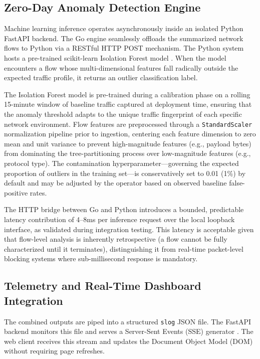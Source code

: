\documentclass[conference]{IEEEtran}
\begin{document}
\subsection{Zero-Day Anomaly Detection Engine}
Machine learning inference operates asynchronously inside an isolated Python FastAPI backend. The Go engine seamlessly offloads the summarized network flows to Python via a RESTful HTTP POST mechanism. The Python system hosts a pre-trained scikit-learn Isolation Forest model \cite{scikit2011}. When the model encounters a flow whose multi-dimensional features fall radically outside the expected traffic profile, it returns an outlier classification label.

The Isolation Forest model is pre-trained during a calibration phase on a rolling 15-minute window of baseline traffic captured at deployment time, ensuring that the anomaly threshold adapts to the unique traffic fingerprint of each specific network environment. Flow features are preprocessed through a \texttt{StandardScaler} normalization pipeline prior to ingestion, centering each feature dimension to zero mean and unit variance to prevent high-magnitude features (e.g., payload bytes) from dominating the tree-partitioning process over low-magnitude features (e.g., protocol type). The contamination hyperparameter---governing the expected proportion of outliers in the training set---is conservatively set to 0.01 (1\%) by default and may be adjusted by the operator based on observed baseline false-positive rates.

The HTTP bridge between Go and Python introduces a bounded, predictable latency contribution of 4--8ms per inference request over the local loopback interface, as validated during integration testing. This latency is acceptable given that flow-level analysis is inherently retrospective (a flow cannot be fully characterized until it terminates), distinguishing it from real-time packet-level blocking systems where sub-millisecond response is mandatory.

\subsection{Telemetry and Real-Time Dashboard Integration}
The combined outputs are piped into a structured \texttt{slog} JSON file. The FastAPI backend monitors this file and serves a Server-Sent Events (SSE) generator \cite{fastapi2025}. The web client receives this stream and updates the Document Object Model (DOM) without requiring page refreshes.
\end{document}
